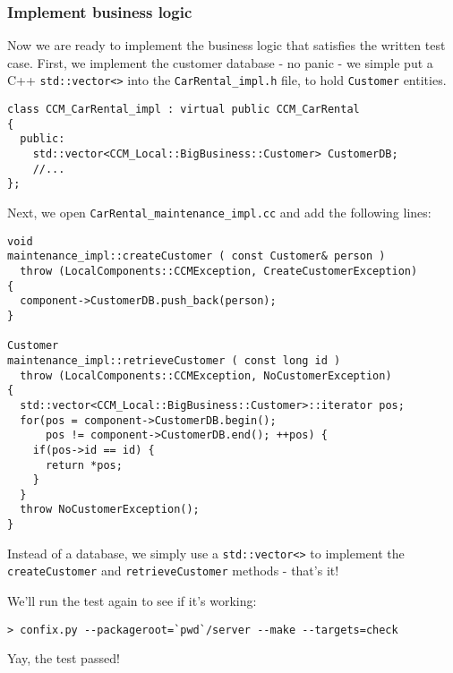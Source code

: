 \subsubsection{Implement business logic}

Now we are ready to implement the business logic that satisfies the written 
test case. 
First, we implement the customer database - no panic - we 
simple put a C++ {\tt std::vector<>} into the {\tt CarRental\_impl.h} file,
to hold {\tt Customer} entities.

\begin{small}
\begin{verbatim}
class CCM_CarRental_impl : virtual public CCM_CarRental
{
  public:
    std::vector<CCM_Local::BigBusiness::Customer> CustomerDB;
    //...
};
\end{verbatim}
\end{small}

Next, we open {\tt CarRental\_maintenance\_impl.cc} and add the following 
lines:
\begin{small}
\begin{verbatim}
void
maintenance_impl::createCustomer ( const Customer& person )
  throw (LocalComponents::CCMException, CreateCustomerException)
{
  component->CustomerDB.push_back(person);
}

Customer
maintenance_impl::retrieveCustomer ( const long id )
  throw (LocalComponents::CCMException, NoCustomerException)
{
  std::vector<CCM_Local::BigBusiness::Customer>::iterator pos;
  for(pos = component->CustomerDB.begin(); 
      pos != component->CustomerDB.end(); ++pos) {
    if(pos->id == id) {
      return *pos;
    }
  }
  throw NoCustomerException();
}
\end{verbatim}
\end{small}

Instead of a database, we simply use a {\tt std::vector<>} to implement
the {\tt createCustomer} and {\tt retrieveCustomer} methods - that's it! 

We'll run the test again to see if it's working:
\begin{small}
\begin{verbatim}
> confix.py --packageroot=`pwd`/server --make --targets=check
\end{verbatim}
\end{small}

Yay, the test passed!



